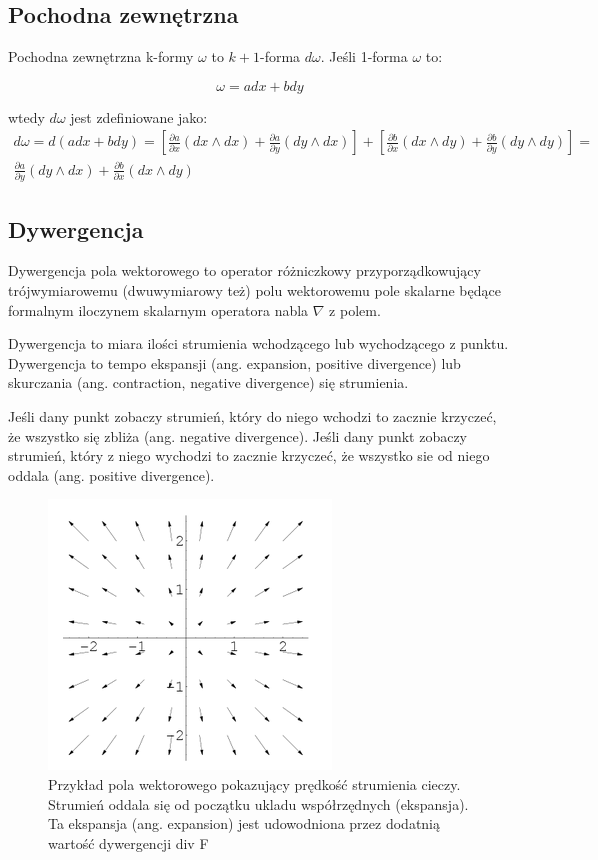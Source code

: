 \documentclass[12pt]{article}
\begin{document}
\subsection{Pochodna zewnętrzna}
Pochodna zewnętrzna k-formy $\omega$ to $k+1$-forma $d \omega$.
Jeśli 1-forma $\omega$ to:

\begin{equation}
\omega = a dx + b dy
\end{equation}

wtedy $d \omega$ jest zdefiniowane jako:
\begin{align*}
d \omega = d(a dx + b dy) = [\frac{\partial a}{\partial x} (dx \wedge dx) + \frac{\partial a}{\partial y} (dy \wedge dx)] + [\frac{\partial b}{\partial x} (dx \wedge dy) + \frac{\partial b}{\partial y} (dy \wedge dy)] =
\\
\frac{\partial a}{\partial y} (dy \wedge dx) + \frac{\partial b}{\partial x} (dx \wedge dy)
\end{align*}

\subsection{Dywergencja}
Dywergencja pola wektorowego to operator różniczkowy przyporządkowujący trójwymiarowemu (dwuwymiarowy też) polu wektorowemu pole skalarne będące formalnym iloczynem skalarnym operatora nabla $\nabla$ z polem. 

Dywergencja to miara ilości strumienia wchodzącego lub wychodzącego z punktu. Dywergencja to tempo ekspansji (ang. expansion, positive divergence) lub skurczania (ang. contraction, negative divergence) się strumienia.

Jeśli dany punkt zobaczy strumień, który do niego wchodzi to zacznie krzyczeć, że wszystko się zbliża (ang. negative divergence). Jeśli dany punkt zobaczy strumień, który z niego wychodzi to zacznie krzyczeć, że wszystko sie od niego oddala (ang. positive divergence).

\begin{figure}[H]
	\centering
	\includegraphics[scale=1.0]{Pictures/vector_field_div.png}
	\caption{Przykład pola wektorowego pokazujący prędkość strumienia cieczy. Strumień oddala się od początku ukladu współrzędnych (ekspansja). Ta ekspansja (ang. expansion) jest udowodniona przez dodatnią wartość dywergencji div F}
\end{figure}
\end{document}
